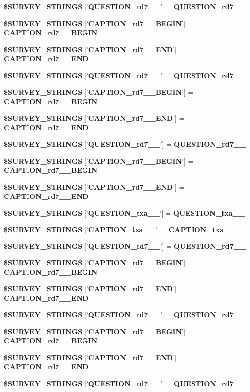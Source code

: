 \begin{CompactItemize}
{\bf \$SURVEY\_\-STRINGS} ['{\bf QUESTION\_\-rd7\_\_\-}'] = {\bf QUESTION\_\-rd7\_\_\-}
\item 
{\bf \$SURVEY\_\-STRINGS} ['{\bf CAPTION\_\-rd7\_\_\-BEGIN}'] = {\bf CAPTION\_\-rd7\_\_\-BEGIN}
\item 
{\bf \$SURVEY\_\-STRINGS} ['{\bf CAPTION\_\-rd7\_\_\-END}'] = {\bf CAPTION\_\-rd7\_\_\-END}
\item 
{\bf \$SURVEY\_\-STRINGS} ['{\bf QUESTION\_\-rd7\_\_\-}'] = {\bf QUESTION\_\-rd7\_\_\-}
\item 
{\bf \$SURVEY\_\-STRINGS} ['{\bf CAPTION\_\-rd7\_\_\-BEGIN}'] = {\bf CAPTION\_\-rd7\_\_\-BEGIN}
\item 
{\bf \$SURVEY\_\-STRINGS} ['{\bf CAPTION\_\-rd7\_\_\-END}'] = {\bf CAPTION\_\-rd7\_\_\-END}
\item 
{\bf \$SURVEY\_\-STRINGS} ['{\bf QUESTION\_\-rd7\_\_\-}'] = {\bf QUESTION\_\-rd7\_\_\-}
\item 
{\bf \$SURVEY\_\-STRINGS} ['{\bf CAPTION\_\-rd7\_\_\-BEGIN}'] = {\bf CAPTION\_\-rd7\_\_\-BEGIN}
\item 
{\bf \$SURVEY\_\-STRINGS} ['{\bf CAPTION\_\-rd7\_\_\-END}'] = {\bf CAPTION\_\-rd7\_\_\-END}
\item 
{\bf \$SURVEY\_\-STRINGS} ['{\bf QUESTION\_\-txa\_\_\-}'] = {\bf QUESTION\_\-txa\_\_\-}
\item 
{\bf \$SURVEY\_\-STRINGS} ['{\bf CAPTION\_\-txa\_\_\-}'] = {\bf CAPTION\_\-txa\_\_\-}
\item 
{\bf \$SURVEY\_\-STRINGS} ['{\bf QUESTION\_\-rd7\_\_\-}'] = {\bf QUESTION\_\-rd7\_\_\-}
\item 
{\bf \$SURVEY\_\-STRINGS} ['{\bf CAPTION\_\-rd7\_\_\-BEGIN}'] = {\bf CAPTION\_\-rd7\_\_\-BEGIN}
\item 
{\bf \$SURVEY\_\-STRINGS} ['{\bf CAPTION\_\-rd7\_\_\-END}'] = {\bf CAPTION\_\-rd7\_\_\-END}
\item 
{\bf \$SURVEY\_\-STRINGS} ['{\bf QUESTION\_\-rd7\_\_\-}'] = {\bf QUESTION\_\-rd7\_\_\-}
\item 
{\bf \$SURVEY\_\-STRINGS} ['{\bf CAPTION\_\-rd7\_\_\-BEGIN}'] = {\bf CAPTION\_\-rd7\_\_\-BEGIN}
\item 
{\bf \$SURVEY\_\-STRINGS} ['{\bf CAPTION\_\-rd7\_\_\-END}'] = {\bf CAPTION\_\-rd7\_\_\-END}
\item 
{\bf \$SURVEY\_\-STRINGS} ['{\bf QUESTION\_\-rd7\_\_\-}'] = {\bf QUESTION\_\-rd7\_\_\-}
\item 

\end{CompactItemize}
